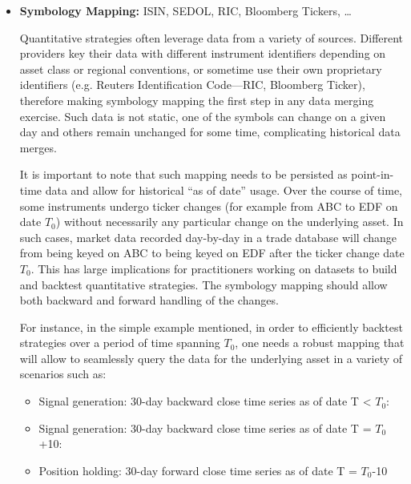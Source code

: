 \begin{itemize}
\item \textbf{Symbology Mapping:} ISIN, SEDOL, RIC, Bloomberg Tickers, \dots

Quantitative strategies often leverage data from a variety of sources. Different providers key their data with different instrument identifiers depending on asset class or regional conventions, or sometime use their own proprietary identifiers (e.g. Reuters Identification Code---RIC, Bloomberg Ticker), therefore making symbology mapping the first step in any data merging exercise. Such data is not static, one of the symbols can change on a given day and others remain unchanged for some time, complicating historical data merges.


It is important to note that such mapping needs to be persisted as point-in-time data and allow for historical ``as of date'' usage. Over the course of time, some instruments undergo ticker changes (for example from ABC to EDF on date $T_0$) without necessarily any particular change on the underlying asset. In such cases, market data recorded day-by-day in a trade database will change from being keyed on ABC to being keyed on EDF after the ticker change date $T_0$. This has large implications for practitioners working on datasets to build and backtest quantitative strategies. The symbology mapping should allow both backward and forward handling of the changes.


For instance, in the simple example mentioned, in order to efficiently backtest strategies over a period of time spanning $T_0$, one needs a robust mapping that will allow to seamlessly query the data for the underlying asset in a variety of scenarios such as:
\begin{itemize}
\item Signal generation: 30-day backward close time series as of date T < $T_0$:

\hspace*{-0.5cm}{\tt select close from data where date in [T-30,  T], sym=ABC}

\item Signal generation: 30-day backward close time series as of date T = $T_0$+10:

\hspace*{-0.5cm}{\tt select close from data where date in [$T_0$-20,  $T_0$+10], sym=EDF}

\item Position holding: 30-day forward close time series as of date T = $T_0$-10


\end{itemize}
\end{itemize}
